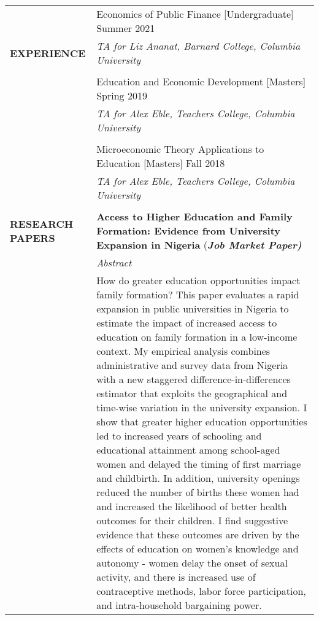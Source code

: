 \documentclass[letterpaper, 11pt]{article}
\begin{document}
\begin{longtable}{p{1.2in}p{4.8in}}

{\textbf{{TEACHING}} 
& Economics of Public Finance [Undergraduate] \hfill Summer 2021 \\ \textbf{{EXPERIENCE}}} 
& \textit{TA for Liz Ananat, Barnard College, Columbia University} \hfill  \\  \\
& Education and Economic Development  [Masters] 
\hfill Spring 2019 \\  
& \textit{TA for Alex Eble, Teachers College, Columbia University} \hfill \\   \\
& Microeconomic Theory Applications to Education  [Masters]  
\hfill Fall 2018 \\ 
& \textit{TA for Alex Eble, Teachers College, Columbia University} \hfill \\ \\




\nohyphens{{\textbf{RESEARCH PAPERS}}} 
& \textbf{\color{Blue}Access to Higher Education and Family Formation: Evidence from University Expansion in Nigeria } (\textit{\textbf{Job Market Paper)}} \\
& \textit{Abstract} \\
& How do greater education opportunities impact family formation? This paper evaluates a rapid expansion in public universities in Nigeria to estimate the impact of increased access to education on family formation in a low-income context. My empirical analysis combines administrative and survey data from Nigeria with a new staggered difference-in-differences estimator that exploits the geographical and time-wise variation in the university expansion. I show that greater higher education opportunities led to increased years of schooling and educational attainment among school-aged women and delayed the timing of first marriage and childbirth. In addition, university openings reduced the number of births these women had and increased the likelihood of better health outcomes for their children. I find suggestive evidence that these outcomes are driven by the effects of education on women's knowledge and autonomy - women delay the onset of sexual activity, and there is increased use of contraceptive methods, labor force participation, and intra-household bargaining power.
& \\


\end{longtable}
\end{document}
